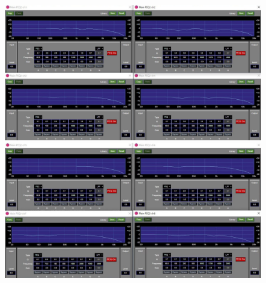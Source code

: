 \documentclass[11pt,a4j]{jreport}
\begin{document}
\begin{figure}[H]
  \begin{minipage}[b]{.5\linewidth}
    \centering
    \includegraphics[width=.9\linewidth]{images/experimentField/afcParameters/base04manualEQ1.jpg}
  \end{minipage}%
  \begin{minipage}[b]{.5\linewidth}
    \centering
    \includegraphics[width=.9\linewidth]{images/experimentField/afcParameters/base04manualEQ2.jpg}
  \end{minipage}


\end{figure}
\end{document}

